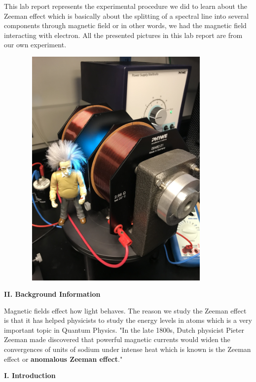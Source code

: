 \documentclass[fleqn]{article}
\begin{document}
  This lab report represents the experimental procedure we did to learn about the Zeeman effect which is basically about 
  the splitting of a spectral line into several components through magnetic field or in other words, we had the magnetic field 
  interacting with electron. All the presented pictures in this lab report are from our own experiment.
  \vspace{10px}

  \includegraphics[height=12cm, width=12cm]{1.jpg}

  \vspace{20px}

  \textbf{II. Background Information}

  \vspace{10px}

  Magnetic fields effect how light behaves. The reason we study the Zeeman effect is that it has helped physicists to study the energy levels
  in atoms which is a very important topic in Quantum Physics.
  "In the late 1800s, Dutch physicist Pieter Zeeman made discovered that powerful magnetic currents would widen the convergences of units 
  of sodium under intense heat which is known is the Zeeman effect or \textbf{anomalous Zeeman effect}." \textcite{One}

  \vspace{20px}

  \textbf{I. Introduction}

  \vspace{10px}
\end{document}
